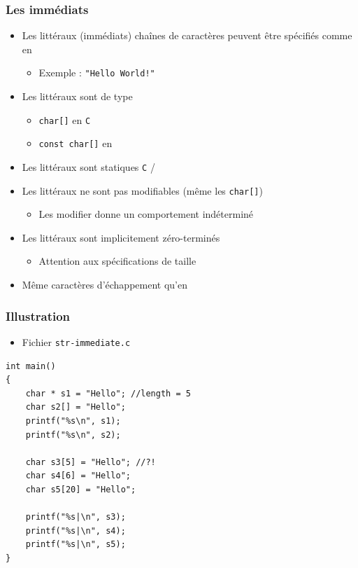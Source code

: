\begin{frame}
\frametitle{Les immédiats}
\begin{itemize}[<+->]
\item Les littéraux (immédiats) chaînes de caractères peuvent être spécifiés comme en \java
	\begin{itemize}
	\item Exemple : \lstinline|"Hello World!"|
	\end{itemize}
\item Les littéraux sont de type
	\begin{itemize}
	\item \lstinline|char[]| en \texttt{C}
	\item \lstinline|const char[]| en \cpp
	\end{itemize}
\item Les littéraux sont statiques \texttt{C} / \cpp
\item Les littéraux ne sont pas modifiables (même les \lstinline|char[]|)
	\begin{itemize}
	\item Les modifier donne un comportement indéterminé
	\end{itemize}
\item Les littéraux sont implicitement zéro-terminés
	\begin{itemize}
	\item Attention aux spécifications de taille
	\end{itemize}
\item Même caractères d'échappement qu'en \java
\end{itemize}
\end{frame}

\begin{frame}[containsverbatim]
\frametitle{Illustration}
\begin{itemize}
\item Fichier \texttt{str-immediate.c}
\end{itemize}
\begin{lstlisting}
int main()
{
	char * s1 = "Hello"; //length = 5
	char s2[] = "Hello";
	printf("%s\n", s1);
	printf("%s\n", s2);

	char s3[5] = "Hello"; //?!
	char s4[6] = "Hello";
	char s5[20] = "Hello";

	printf("%s|\n", s3);
	printf("%s|\n", s4);
	printf("%s|\n", s5);	
}
\end{lstlisting}
\end{frame}

